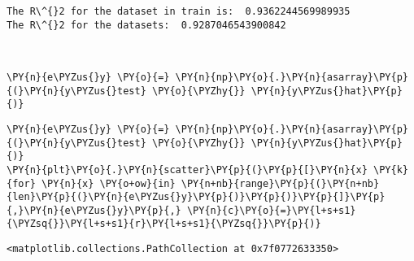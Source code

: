    \begin{Verbatim}[commandchars=\\\{\}]
The R\^{}2 for the dataset in train is:  0.9362244569989935
The R\^{}2 for the datasets:  0.9287046543900842
    \end{Verbatim}

    \begin{center}
    \end{center}
    { \hspace*{\fill} \\}
    
    \begin{tcolorbox}[breakable, size=fbox, boxrule=1pt, pad at break*=1mm,colback=cellbackground, colframe=cellborder]
\begin{Verbatim}[commandchars=\\\{\}]
\PY{n}{e\PYZus{}y} \PY{o}{=} \PY{n}{np}\PY{o}{.}\PY{n}{asarray}\PY{p}{(}\PY{n}{y\PYZus{}test} \PY{o}{\PYZhy{}} \PY{n}{y\PYZus{}hat}\PY{p}{)}
\end{Verbatim}
\end{tcolorbox}

    \begin{tcolorbox}[breakable, size=fbox, boxrule=1pt, pad at break*=1mm,colback=cellbackground, colframe=cellborder]
\begin{Verbatim}[commandchars=\\\{\}]
\PY{n}{e\PYZus{}y} \PY{o}{=} \PY{n}{np}\PY{o}{.}\PY{n}{asarray}\PY{p}{(}\PY{n}{y\PYZus{}test} \PY{o}{\PYZhy{}} \PY{n}{y\PYZus{}hat}\PY{p}{)}
\PY{n}{plt}\PY{o}{.}\PY{n}{scatter}\PY{p}{(}\PY{p}{[}\PY{n}{x} \PY{k}{for} \PY{n}{x} \PY{o+ow}{in} \PY{n+nb}{range}\PY{p}{(}\PY{n+nb}{len}\PY{p}{(}\PY{n}{e\PYZus{}y}\PY{p}{)}\PY{p}{)}\PY{p}{]}\PY{p}{,}\PY{n}{e\PYZus{}y}\PY{p}{,} \PY{n}{c}\PY{o}{=}\PY{l+s+s1}{\PYZsq{}}\PY{l+s+s1}{r}\PY{l+s+s1}{\PYZsq{}}\PY{p}{)}
\end{Verbatim}
\end{tcolorbox}

            \begin{tcolorbox}[breakable, size=fbox, boxrule=.5pt, pad at break*=1mm, opacityfill=0]
\begin{Verbatim}[commandchars=\\\{\}]
<matplotlib.collections.PathCollection at 0x7f0772633350>
\end{Verbatim}
\end{tcolorbox}
        
